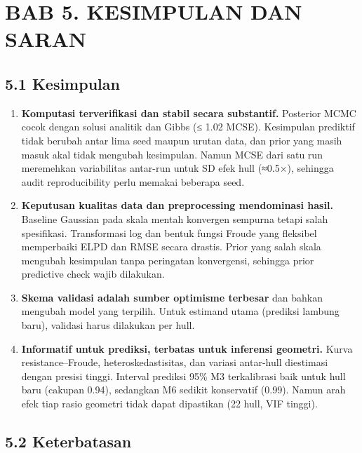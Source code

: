 \documentclass[
]{article}
\providecommand{\tightlist}{%
  \setlength{\itemsep}{0pt}\setlength{\parskip}{0pt}}
\begin{document}
\clearpage

\section{BAB 5. KESIMPULAN DAN SARAN}\label{bab-5.-kesimpulan-dan-saran}

\subsection{5.1 Kesimpulan}\label{kesimpulan}

\begin{enumerate}
\def\labelenumi{\arabic{enumi}.}
\tightlist
\item
  \textbf{Komputasi terverifikasi dan stabil secara substantif.}
  Posterior MCMC cocok dengan solusi analitik dan Gibbs (≤ 1.02 MCSE).
  Kesimpulan prediktif tidak berubah antar lima seed maupun urutan data,
  dan prior yang masih masuk akal tidak mengubah kesimpulan. Namun MCSE
  dari satu run meremehkan variabilitas antar-run untuk SD efek hull
  (≈0.5×), sehingga audit reproducibility perlu memakai beberapa seed.
\item
  \textbf{Keputusan kualitas data dan preprocessing mendominasi hasil.}
  Baseline Gaussian pada skala mentah konvergen sempurna tetapi salah
  spesifikasi. Transformasi log dan bentuk fungsi Froude yang fleksibel
  memperbaiki ELPD dan RMSE secara drastis. Prior yang salah skala
  mengubah kesimpulan tanpa peringatan konvergensi, sehingga prior
  predictive check wajib dilakukan.
\item
  \textbf{Skema validasi adalah sumber optimisme terbesar} dan bahkan
  mengubah model yang terpilih. Untuk estimand utama (prediksi lambung
  baru), validasi harus dilakukan per hull.
\item
  \textbf{Informatif untuk prediksi, terbatas untuk inferensi geometri.}
  Kurva resistance--Froude, heteroskedastisitas, dan variasi antar-hull
  diestimasi dengan presisi tinggi. Interval prediksi 95\% M3
  terkalibrasi baik untuk hull baru (cakupan 0.94), sedangkan M6 sedikit
  konservatif (0.99). Namun arah efek tiap rasio geometri tidak dapat
  dipastikan (22 hull, VIF tinggi).
\end{enumerate}

\subsection{5.2 Keterbatasan}\label{keterbatasan}
\end{document}
